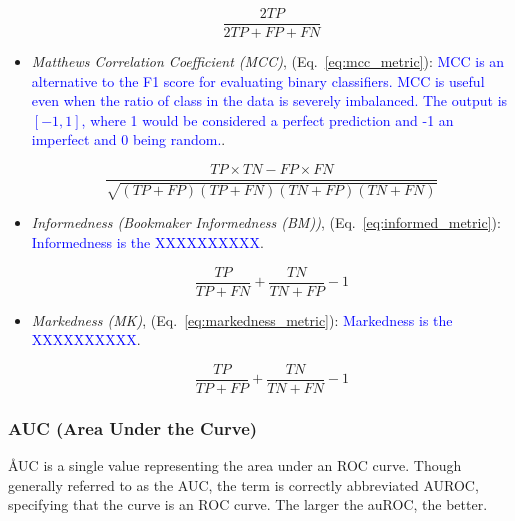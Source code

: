 \begin{itemize}[noitemsep,topsep=0pt]
\begin{equation}
{\frac{2TP}{2TP+FP+FN}}
\label{eq:f1_metric}
\end{equation}

\item \textit{Matthews Correlation Coefficient (MCC)}, (Eq.~\ref{eq:mcc_metric}): \textcolor{blue}{MCC is  an alternative to the F1 score for evaluating binary classifiers. MCC is useful even when the ratio of class in the data is severely imbalanced. The output is $[-1,1]$, where 1 would be considered a perfect prediction and -1 an imperfect and 0 being random.}.

\begin{equation}
{\frac{TP \times TN - FP \times FN}{\sqrt{(TP + FP)(TP + FN)(TN + FP)(TN + FN)}}}
\label{eq:mcc_metric}
\end{equation}

\item \textit{Informedness (Bookmaker Informedness (BM))}, (Eq.~\ref{eq:informed_metric}): \textcolor{blue}{Informedness is the XXXXXXXXXX}.

\begin{equation}
{\frac{TP}{TP+FN}+\frac{TN}{TN+FP}-1}
\label{eq:informed_metric}
\end{equation}

\item \textit{Markedness (MK)}, (Eq.~\ref{eq:markedness_metric}): \textcolor{blue}{Markedness is the XXXXXXXXXX}.

\begin{equation}
{\frac{TP}{TP+FP}+\frac{TN}{TN+FN}-1}
\label{eq:markedness_metric}
\end{equation}


\end{itemize}

\subsubsection{AUC (Area Under the Curve)}


\r{AUC is a single value representing the area under an ROC curve. Though generally referred to as the AUC, the term is correctly abbreviated AUROC, specifying that the curve is an ROC curve. The larger the auROC, the better.}


